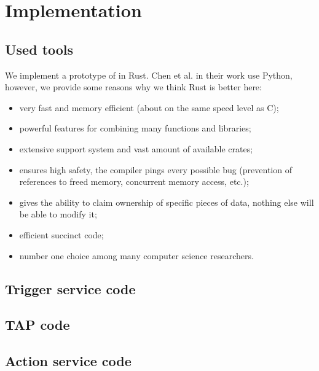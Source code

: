 \section{Implementation}
\label{sec:implementation}

\subsection{Used tools}

We implement a prototype of \sys in Rust. Chen et al. \cite{DBLP:conf/sp/ChenCWSCF21} in their work use Python, however, we provide some reasons why we think Rust is better here: 
\begin{itemize}
	\item very fast and memory efficient (about on the same speed level as C);
	\item powerful features for combining many functions and libraries;
	\item extensive support system and vast amount of available crates;
	\item ensures high safety, the compiler pings every possible bug (prevention of references to freed memory, concurrent memory access, etc.);
	\item gives the ability to claim ownership of specific pieces of data, nothing else will be able to modify it;
	\item efficient succinct code;
	\item number one choice among many computer science researchers.
\end{itemize}

\subsection{Trigger service code}

\subsection{TAP code}

\subsection{Action service code}